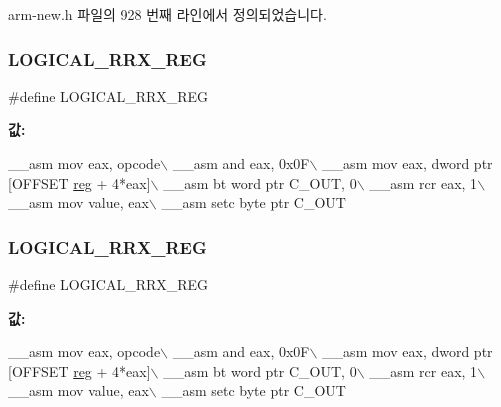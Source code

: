 arm-\/new.\+h 파일의 928 번째 라인에서 정의되었습니다.

\mbox{\label{_g_b_a_8cpp_a835764828d538c5d68830f7d9d44bf74}} 
\subsubsection{\texorpdfstring{L\+O\+G\+I\+C\+A\+L\+\_\+\+R\+R\+X\+\_\+\+R\+EG}{LOGICAL\_RRX\_REG}\hspace{0.1cm}{\footnotesize\ttfamily [1/2]}}
{\footnotesize\ttfamily \#define L\+O\+G\+I\+C\+A\+L\+\_\+\+R\+R\+X\+\_\+\+R\+EG}

{\bfseries 값\+:}
\begin{DoxyCode}
\_\_asm mov eax, opcode\(\backslash\)
        \_\_asm and eax, 0x0F\(\backslash\)
        \_\_asm mov eax, dword ptr [OFFSET \mbox{\hyperlink{_g_b_a_8h_ae29faba89509024ffd1a292badcedf2d}{reg}} + 4*eax]\(\backslash\)
        \_\_asm bt word ptr C\_OUT, 0\(\backslash\)
        \_\_asm rcr eax, 1\(\backslash\)
        \_\_asm mov value, eax\(\backslash\)
        \_\_asm setc byte ptr C\_OUT
\end{DoxyCode}
\mbox{\label{arm-new_8h_a835764828d538c5d68830f7d9d44bf74}} 
\subsubsection{\texorpdfstring{L\+O\+G\+I\+C\+A\+L\+\_\+\+R\+R\+X\+\_\+\+R\+EG}{LOGICAL\_RRX\_REG}\hspace{0.1cm}{\footnotesize\ttfamily [2/2]}}
{\footnotesize\ttfamily \#define L\+O\+G\+I\+C\+A\+L\+\_\+\+R\+R\+X\+\_\+\+R\+EG}

{\bfseries 값\+:}
\begin{DoxyCode}
\_\_asm mov eax, opcode\(\backslash\)
        \_\_asm and eax, 0x0F\(\backslash\)
        \_\_asm mov eax, dword ptr [OFFSET \mbox{\hyperlink{_g_b_a_8h_ae29faba89509024ffd1a292badcedf2d}{reg}} + 4*eax]\(\backslash\)
        \_\_asm bt word ptr C\_OUT, 0\(\backslash\)
        \_\_asm rcr eax, 1\(\backslash\)
        \_\_asm mov value, eax\(\backslash\)
        \_\_asm setc byte ptr C\_OUT
\end{DoxyCode}



